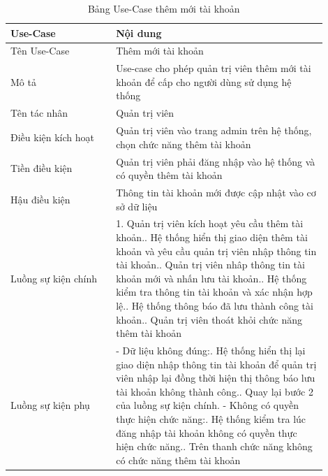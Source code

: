 \begin{longtable}[htp]{ |m{0.3\linewidth}|m{0.6\linewidth}|}
 \caption{Bảng Use-Case thêm mới tài khoản \label{long}}\\
 \hline
 Use-Case & Nội dung \\
 \hline
 Tên Use-Case & Thêm mới tài khoản \\
 \hline
 Mô tả & Use-case cho phép quản trị viên thêm mới tài khoản để cấp cho người dùng sử dụng hệ thống\\
 \hline
 Tên tác nhân & Quản trị viên\\
 \hline
 Điều kiện kích hoạt & Quản trị viên vào trang admin trên hệ thống, chọn chức năng thêm tài khoản\\
 \hline
 Tiền điều kiện & Quản trị viên phải đăng nhập vào hệ thống và có quyền thêm tài khoản\\
 \hline
 Hậu điều kiện & Thông tin tài khoản mới được cập nhật vào cơ sở dữ liệu\\
 \hline
 Luồng sự kiện chính & 
 1. Quản trị viên kích hoạt yêu cầu thêm tài khoản.\newline
 2. Hệ thống hiển thị giao diện thêm tài khoản và yêu cầu quản trị viên nhập thông tin tài khoản.\newline
 3. Quản trị viên nhâp thông tin tài khoản mới và nhấn lưu tài khoản.\newline
 4. Hệ thống kiểm tra thông tin tài khoản và xác nhận hợp lệ.\newline
 5. Hệ thống thông báo đã lưu thành công tài khoản.\newline	
 6. Quản trị viên thoát khỏi chức năng thêm tài khoản
 \\
 \hline
 Luồng sự kiện phụ & 
 - Dữ liệu không đúng:\newline
  1. Hệ thống hiển thị lại giao diện nhập thông tin tài khoản để quản trị viên nhập lại đồng thời hiện thị thông báo lưu tài khoản không thành công.\newline
  2. Quay lại bước 2 của luồng sự kiện chính.\newline
  - Không có quyền thực hiện chức năng:\newline
  1. Hệ thống kiểm tra lúc đăng nhập tài khoản không có quyền thực hiện chức năng.\newline
  2. Trên thanh chức năng không có chức năng thêm tài khoản
 \\
 \hline
\end{longtable}

